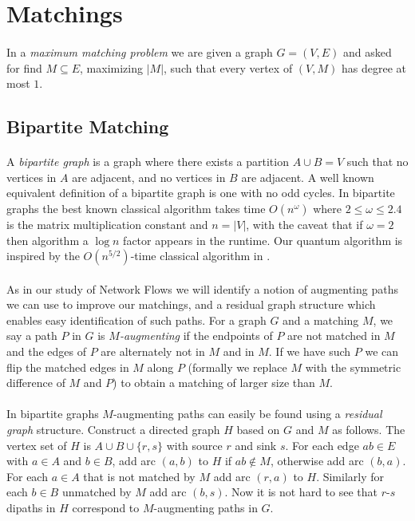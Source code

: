 \section{Matchings}\label{sec:matching}
\paragraph{}
In a {\it maximum matching problem} we are given a graph $G=(V,E)$ and asked for find  $M\subseteq E$, maximizing $|M|$, such that every vertex of $(V,M)$ has degree at most $1$. \subsection{Bipartite Matching}
\paragraph{}
A {\it bipartite graph} is a graph where there exists a partition $A\cup B = V$ such that no vertices in $A$ are adjacent, and no vertices in $B$ are adjacent. A well known equivalent definition of a bipartite graph is one with no odd cycles. In bipartite graphs the best known classical algorithm takes time $O(n^\omega)$ \cite{mucha2004maximum} where $2\leq\omega\leq 2.4$ is the matrix multiplication constant and $n = |V|$, with the caveat that if $\omega = 2$ then algorithm a $\log n$ factor appears in the runtime.  Our quantum algorithm is inspired by the $O(n^{5/2})$-time classical algorithm in \cite{hopkroft1973n5}.
\paragraph{}
As in our study of Network Flows we will identify a notion of augmenting paths we can use to improve our matchings, and a residual graph structure which enables easy identification of such paths. For a graph $G$ and a matching $M$, we say a path $P$ in $G$ is {\it $M$-augmenting} if the endpoints of $P$ are not matched in $M$ and the edges of $P$ are alternately not in $M$ and in $M$. If we have such $P$ we can flip the matched edges in $M$ along $P$ (formally we replace $M$ with the symmetric difference of $M$ and $P$) to obtain a matching of larger size than $M$.
\paragraph{}
In bipartite graphs $M$-augmenting paths can easily be found using a {\it residual graph} structure. Construct a directed graph $H$ based on $G$ and $M$ as follows. The vertex set of $H$ is $A\cup B\cup \{r,s\}$ with source $r$ and sink $s$. For each edge $ab \in E$ with $a \in A$ and $b\in B$,  add arc $(a,b)$ to $H$ if $ab \not\in M$, otherwise add arc $(b,a)$. For each $a \in A$ that is not matched by $M$ add arc $(r,a)$ to $H$. Similarly for each $b \in B$ unmatched by $M$ add arc $(b,s)$. Now it is not hard to see that $r$-$s$ dipaths in $H$ correspond to $M$-augmenting paths in $G$.
